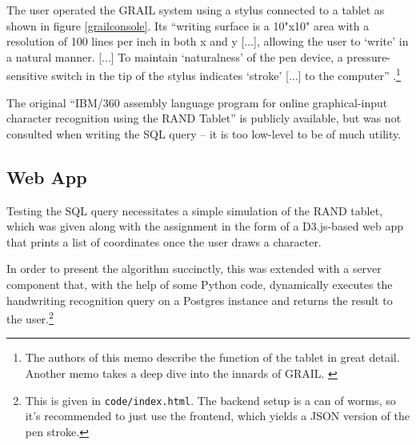 \documentclass[sigconf]{acmart}
\begin{document}
The user operated the GRAIL system using a stylus connected to a tablet as shown in figure \ref{grailconsole}. Its \enquote{writing surface is a 10"x10" area with a resolution of 100 lines per inch in both x and y [...], allowing the user to \enquote{write} in a natural manner. [...] To maintain \enquote{naturalness} of the pen device, a pressure-sensitive switch in the tip of the stylus indicates \enquote{stroke} [...] to the computer} \cite{tablet}.\footnote{The authors of this memo describe the function of the tablet in great detail. Another memo takes a deep dive into the innards of GRAIL. \cite{details}}

The original \enquote{IBM/360 assembly language program for online graphical-input character recognition using the RAND Tablet} \cite{source} is publicly available, but was not consulted when writing the SQL query – it is too low-level to be of much utility.

\subsection{Web App}

Testing the SQL query necessitates a simple simulation of the RAND tablet, which was given along with the assignment in the form of a D3.js-based web app that prints a list of coordinates once the user draws a character.

In order to present the algorithm succinctly, this was extended with a server component that, with the help of some Python code, dynamically executes the handwriting recognition query on a Postgres instance and returns the result to the user.\footnote{This is given in \texttt{code/index.html}. The backend setup is a can of worms, so it's recommended to just use the frontend, which yields a JSON version of the pen stroke.}
\end{document}
